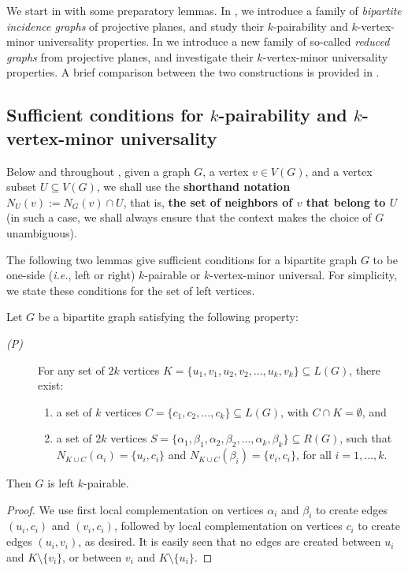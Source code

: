 \documentclass[a4paper,UKenglish,cleveref, autoref, thm-restate]{arxiv}
\begin{document}
We start in  with some preparatory lemmas.  In , we introduce a family of  \emph{bipartite incidence graphs} of projective planes, and study their  $k$-pairability and $k$-vertex-minor universality properties. In  we introduce a new family of so-called \emph{reduced graphs} from projective planes, and investigate their $k$-vertex-minor universality properties. A brief comparison between the two constructions is provided in .

\subsection{Sufficient conditions for $k$-pairability and $k$-vertex-minor universality}
\label{subsec:lemmas-k-pairability-vmu}

Below and throughout , given a graph $G$, a vertex $v\in V(G)$, and a vertex subset $U\subseteq V(G)$, we shall use the \textbf{shorthand notation} $N_U(v) := N_G(v) \cap U$, that is,  \textbf{the set of neighbors of $v$ that belong to $U$} (in such a case, we shall always ensure that the context makes the choice of $G$ unambiguous). 

The following two lemmas give sufficient conditions for a bipartite graph $G$ to be one-side (\emph{i.e.}, left or right) $k$-pairable or $k$-vertex-minor universal. For simplicity, we state these conditions for the set of left vertices.  
	
\begin{lemma}\label{lemma:Pcondition}
    Let $G$ be a bipartite graph satisfying the following property:
    \begin{description}
        \item[{\rm\em (P)}] For any set of $2k$  vertices $K = \{u_1,v_1, u_2,v_2, \dots, u_k, v_k\} \subseteq L(G)$, there exist:
              \begin{enumerate}
                  \item  a set of $k$  vertices $C = \{c_1, c_2,\dots, c_k \} \subseteq L(G)$, with  $C\cap K = \emptyset$, and
                  \item  a  set of $2k$  vertices $S = \{\alpha_1,\beta_1, \alpha_2,\beta_2, \dots, \alpha_k, \beta_k\} \subseteq R(G)$, such that $N_{K \cup C} (\alpha_i) = \{u_i, c_i\}$ and $N_{K \cup C} (\beta_i) = \{v_i, c_i\}$, for all $i=1,\dots,k$.
              \end{enumerate}
    \end{description}
    Then $G$ is left $k$-pairable.
\end{lemma}
\begin{proof}
    We  use  first local complementation on vertices $\alpha_i$ and $\beta_i$ to create edges $(u_i, c_i)$ and $(v_i, c_i)$, followed by local complementation on vertices $c_i$ to create edges $(u_i, v_i)$, as desired. It is easily seen that no edges are created between $u_i$ and $K\setminus\{v_i\}$, or between $v_i$ and $K\setminus\{u_i\}$.
\end{proof}
\end{document}

